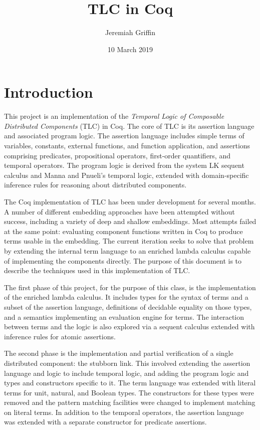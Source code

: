 \documentclass[12pt]{article}
\title{TLC in Coq}
\author{Jeremiah Griffin}
\date{10 March 2019}
\begin{document}
\maketitle

\section{Introduction}

This project is an implementation of the \emph{Temporal Logic of
Composable Distributed Components} (TLC) in Coq.  The core of TLC is its
assertion language and associated program logic.  The assertion language
includes simple terms of variables, constants, external functions, and
function application, and assertions comprising predicates,
propositional operators, first-order quantifiers, and temporal
operators.  The program logic is derived from the system LK sequent
calculus and Manna and Pnueli's temporal logic, extended with
domain-specific inference rules for reasoning about distributed
components.

The Coq implementation of TLC has been under development for several
months.  A number of different embedding approaches have been attempted
without success, including a variety of deep and shallow embeddings.
Most attempts failed at the same point: evaluating component functions
written in Coq to produce terms usable in the embedding.  The current
iteration seeks to solve that problem by extending the internal term
language to an enriched lambda calculus capable of implementing the
components directly.  The purpose of this document is to describe the
techniques used in this implementation of TLC.

The first phase of this project, for the purpose of this class, is the
implementation of the enriched lambda calculus.  It includes types for
the syntax of terms and a subset of the assertion language, definitions
of decidable equality on those types, and a semantics implementing an
evaluation engine for terms.  The interaction between terms and the
logic is also explored via a sequent calculus extended with inference
rules for atomic assertions.

The second phase is the implementation and partial verification of a
single distributed component: the stubborn link.  This involved
extending the assertion language and logic to include temporal logic,
and adding the program logic and types and constructors specific to it.
The term language was extended with literal terms for unit, natural,
and Boolean types.  The constructors for these types were removed and
the pattern matching facilities were changed to implement matching on
literal terms.  In addition to the temporal operators, the assertion
language was extended with a separate constructor for predicate
assertions.
\end{document}

